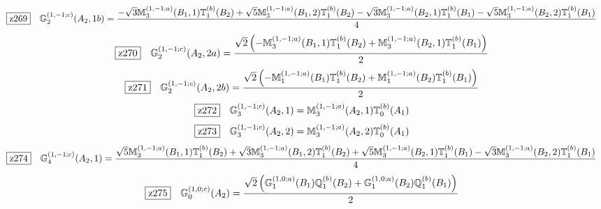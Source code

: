 \documentclass[fleqn,10pt,landscape]{jsarticle}
\begin{document}
\begin{dmath*}
\hspace*{3mm}\fbox{z269}\quad \mathbb{G}_{2}^{(1,-1;c)}(A_{2},1b)=\frac{- \sqrt{3} \mathbb{M}_{3}^{(1,-1;a)}(B_{1},1) \mathbb{T}_{1}^{(b)}(B_{2}) + \sqrt{5} \mathbb{M}_{3}^{(1,-1;a)}(B_{1},2) \mathbb{T}_{1}^{(b)}(B_{2}) - \sqrt{3} \mathbb{M}_{3}^{(1,-1;a)}(B_{2},1) \mathbb{T}_{1}^{(b)}(B_{1}) - \sqrt{5} \mathbb{M}_{3}^{(1,-1;a)}(B_{2},2) \mathbb{T}_{1}^{(b)}(B_{1})}{4}
\end{dmath*}
\begin{dmath*}
\hspace*{3mm}\fbox{z270}\quad \mathbb{G}_{2}^{(1,-1;c)}(A_{2},2a)=\frac{\sqrt{2} \left(- \mathbb{M}_{3}^{(1,-1;a)}(B_{1},1) \mathbb{T}_{1}^{(b)}(B_{2}) + \mathbb{M}_{3}^{(1,-1;a)}(B_{2},1) \mathbb{T}_{1}^{(b)}(B_{1})\right)}{2}
\end{dmath*}
\begin{dmath*}
\hspace*{3mm}\fbox{z271}\quad \mathbb{G}_{2}^{(1,-1;c)}(A_{2},2b)=\frac{\sqrt{2} \left(- \mathbb{M}_{1}^{(1,-1;a)}(B_{1}) \mathbb{T}_{1}^{(b)}(B_{2}) + \mathbb{M}_{1}^{(1,-1;a)}(B_{2}) \mathbb{T}_{1}^{(b)}(B_{1})\right)}{2}
\end{dmath*}
\begin{dmath*}
\hspace*{3mm}\fbox{z272}\quad \mathbb{G}_{3}^{(1,-1;c)}(A_{2},1)=\mathbb{M}_{3}^{(1,-1;a)}(A_{2},1) \mathbb{T}_{0}^{(b)}(A_{1})
\end{dmath*}
\begin{dmath*}
\hspace*{3mm}\fbox{z273}\quad \mathbb{G}_{3}^{(1,-1;c)}(A_{2},2)=\mathbb{M}_{3}^{(1,-1;a)}(A_{2},2) \mathbb{T}_{0}^{(b)}(A_{1})
\end{dmath*}
\begin{dmath*}
\hspace*{3mm}\fbox{z274}\quad \mathbb{G}_{4}^{(1,-1;c)}(A_{2},1)=\frac{\sqrt{5} \mathbb{M}_{3}^{(1,-1;a)}(B_{1},1) \mathbb{T}_{1}^{(b)}(B_{2}) + \sqrt{3} \mathbb{M}_{3}^{(1,-1;a)}(B_{1},2) \mathbb{T}_{1}^{(b)}(B_{2}) + \sqrt{5} \mathbb{M}_{3}^{(1,-1;a)}(B_{2},1) \mathbb{T}_{1}^{(b)}(B_{1}) - \sqrt{3} \mathbb{M}_{3}^{(1,-1;a)}(B_{2},2) \mathbb{T}_{1}^{(b)}(B_{1})}{4}
\end{dmath*}
\begin{dmath*}
\hspace*{3mm}\fbox{z275}\quad \mathbb{G}_{0}^{(1,0;c)}(A_{2})=\frac{\sqrt{2} \left(\mathbb{G}_{1}^{(1,0;a)}(B_{1}) \mathbb{Q}_{1}^{(b)}(B_{2}) + \mathbb{G}_{1}^{(1,0;a)}(B_{2}) \mathbb{Q}_{1}^{(b)}(B_{1})\right)}{2}
\end{dmath*}
\end{document}
